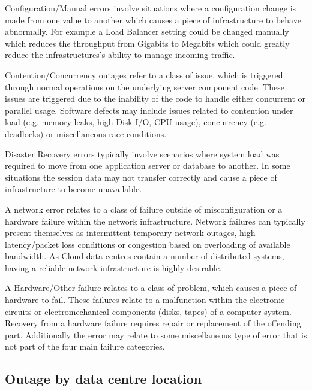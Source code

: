 Configuration/Manual errors involve situations where a configuration change is made from one value to another which causes a piece of infrastructure to behave abnormally. For example a Load Balancer setting could be changed manually which reduces the throughput from Gigabits to Megabits which could greatly reduce the infrastructures's ability to manage incoming traffic.\par

Contention/Concurrency outages refer to a class of issue, which is triggered through normal operations on the underlying server component code. These issues are triggered due to the inability of the code to handle either concurrent or parallel usage. Software defects may include issues related to contention under load (e.g. memory leaks, high Disk I/O, CPU usage), concurrency (e.g. deadlocks) or miscellaneous race conditions. \par

Disaster Recovery errors typically involve scenarios where system load was required to move from one application server or database to another. In some situations the session data may not transfer correctly and cause a piece of infrastructure to become unavailable. \par

A network error relates to a class of failure outside of misconfiguration or a hardware failure within the network infrastructure. Network failures can typically present themselves as intermittent temporary network outages, high latency/packet loss conditions or congestion based on overloading of available bandwidth. As Cloud data centres contain a number of distributed systems, having a reliable network infrastructure is highly desirable. \par

A Hardware/Other failure relates to a class of problem, which causes a piece of hardware to fail. These failures relate to a malfunction within the electronic circuits or electromechanical components (disks, tapes) of a computer system. Recovery from a hardware failure requires repair or replacement of the offending part. Additionally the error may relate to some miscellaneous type of error that is not part of the four main failure categories. \par

\subsection{Outage by data centre location}


